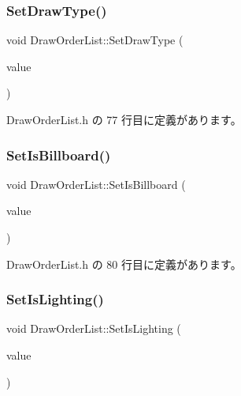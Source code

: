 \subsubsection{\texorpdfstring{Set\+Draw\+Type()}{SetDrawType()}}
{\footnotesize\ttfamily void Draw\+Order\+List\+::\+Set\+Draw\+Type (\begin{DoxyParamCaption}\item[{\mbox{\hyperlink{class_draw_order_list_a6c9b9ceb312c16d399ef355f4f3486bb}{Draw\+Type}}}]{value }\end{DoxyParamCaption})\hspace{0.3cm}{\ttfamily [inline]}}



 Draw\+Order\+List.\+h の 77 行目に定義があります。

\mbox{\label{class_draw_order_list_abfb13518e5747d3faa351ca64ec676b2}} 
\subsubsection{\texorpdfstring{Set\+Is\+Billboard()}{SetIsBillboard()}}
{\footnotesize\ttfamily void Draw\+Order\+List\+::\+Set\+Is\+Billboard (\begin{DoxyParamCaption}\item[{bool}]{value }\end{DoxyParamCaption})\hspace{0.3cm}{\ttfamily [inline]}}



 Draw\+Order\+List.\+h の 80 行目に定義があります。

\mbox{\label{class_draw_order_list_a233843bc98d389d9cfc79108b599c7a9}} 
\subsubsection{\texorpdfstring{Set\+Is\+Lighting()}{SetIsLighting()}}
{\footnotesize\ttfamily void Draw\+Order\+List\+::\+Set\+Is\+Lighting (\begin{DoxyParamCaption}\item[{bool}]{value }\end{DoxyParamCaption})\hspace{0.3cm}{\ttfamily [inline]}}



